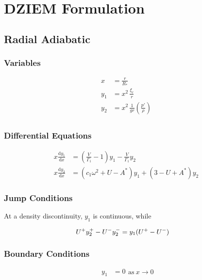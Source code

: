 \documentclass[fleqn]{article}
\newcommand{\diff}{\ensuremath{\mathrm{d}}}
\newcommand{\Vg}{\ensuremath{\frac{V}{\Gamma_{1}}}}
\newcommand{\As}{\ensuremath{A^{\ast}}}
\newcommand{\Rstar}{\ensuremath{R_{\ast}}}
\begin{document}

\section*{DZIEM Formulation}

\subsection*{Radial Adiabatic}

\subsubsection*{Variables}

\begin{align*}
x     &= \frac{r}{\Rstar} \\
y_{1} &= x^{2}\, \frac{\xi_{r}}{r} \\
y_{2} &= x^{2}\, \frac{1}{gr} \left( \frac{p'}{\rho} \right) \\
\end{align*}

\subsubsection*{Differential Equations}

\begin{align*}
x \frac{\diff y_{1}}{\diff x} &=
\left(\Vg - 1 \right) y_{1} 
- \Vg y_{2} \\
x \frac{\diff y_{2}}{\diff x} &=
(c_{1} \omega^{2} + U - \As ) y_{1} +
(3 - U + \As) y_{2}
\end{align*}

\subsubsection*{Jump Conditions}

At a density discontinuity, $y_{1}$ is continuous, while

\begin{align*}
U^{\rm +} y_{2}^{+} - U^{-} y_{2}^{-} &= y_{1} (U^{+} - U^{-})
\end{align*}

\subsubsection*{Boundary Conditions}

\begin{equation*}
\begin{aligned}
y_{1} &= 0
\end{aligned}
\text{as}\ x \rightarrow 0
\end{equation*}
\end{document}
